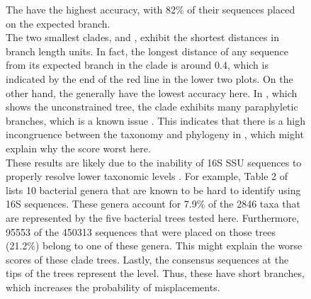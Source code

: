 \begin{figure}[hpbt]
{        The  have the highest accuracy,
        with 82\% of their sequences placed on the expected branch.
        \\
        The two smallest clades,  and ,
        exhibit the shortest distances in branch length units.
        In fact, the longest distance of any sequence from its expected branch in the  clade
        is around \num{0.4}, which is indicated by the end of the red line in the lower two plots.
        On the other hand, the  generally have the lowest accuracy here.
        In , which shows the unconstrained  tree,
        the  clade exhibits many paraphyletic branches,
        which is a known issue \citep{Parks2018}.
        This indicates that there is a high incongruence
        between the  taxonomy and phylogeny in ,
        which might explain why the  score worst here.
        \\
        These results are likely due to the inability of 16S SSU sequences to properly resolve lower taxonomic levels
        \citep{Mignard2006,Petti2007,Janda2007}.
        For example, Table 2 of \citep{Janda2007} lists \num{10} bacterial genera
        that are known to be hard to identify using 16S sequences.
        These genera account for \num{7.9}\% of the \num{2846} taxa
        that are represented by the five bacterial trees tested here.
        Furthermore, \num{95 553} of the \num{450 313} sequences that were placed on those trees (\num{21.2}\%)
        belong to one of these genera.
        This might explain the worse scores of these clade trees.
        Lastly, the consensus sequences at the tips of the trees represent the  level.
        Thus, these have short branches, which increases the probability of misplacements.
%
    }
    \label{fig:multilevel}
\end{figure}

